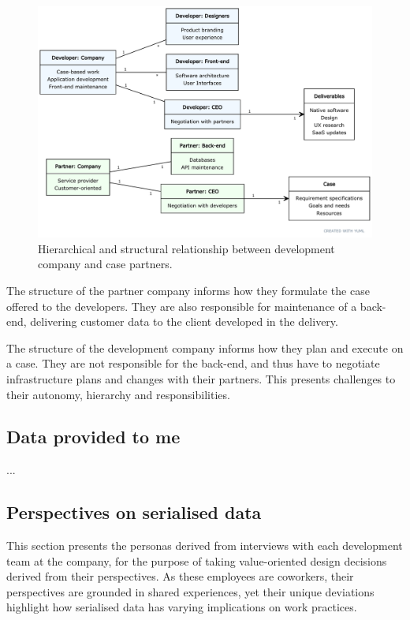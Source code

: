 \documentclass[../report.tex]{subfiles}
\begin{document}
\begin{figure}[H]
\centering
\includegraphics[width=\linewidth]{figures/organisation.pdf}
\caption{Hierarchical and structural relationship between development company and case partners.}
\label{fig:organisation}
\end{figure}

The structure of the partner company informs how they formulate the case offered to the developers. They are also responsible for maintenance of a back-end, delivering customer data to the client developed in the delivery.

The structure of the development company informs how they plan and execute on a case. They are not responsible for the back-end, and thus have to negotiate infrastructure plans and changes with their partners. This presents challenges to their autonomy, hierarchy and responsibilities.

\subsection{Data provided to me}

...

\subsection{Perspectives on serialised data}

This section presents the personas derived from interviews with each development team at the company, for the purpose of taking value-oriented design decisions derived from their perspectives. As these employees are coworkers, their perspectives are grounded in shared experiences, yet their unique deviations highlight how serialised data has varying implications on work practices.
\end{document}
